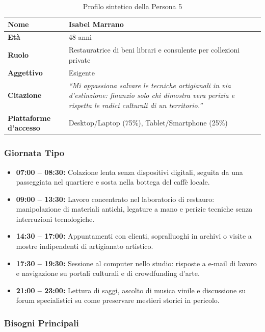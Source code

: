 \documentclass[11pt,a4paper]{article}
\begin{document}
\begin{table}[h!]
\centering
\small
\begin{tabular}{|p{3.5cm}|p{11.5cm}|}
\hline
\textbf{Nome} & Isabel Marrano \\ \hline
\textbf{Età} & 48 anni \\ \hline
\textbf{Ruolo} & Restauratrice di beni librari e consulente per collezioni private \\ \hline
\textbf{Aggettivo} & Esigente \\ \hline
\textbf{Citazione} & \textit{``Mi appassiona salvare le tecniche artigianali in via d'estinzione: finanzio solo chi dimostra vera perizia e rispetta le radici culturali di un territorio.''} \\ \hline
\textbf{Piattaforme d'accesso} & Desktop/Laptop (75\%), Tablet/Smartphone (25\%) \\ \hline
\end{tabular}
\caption{Profilo sintetico della Persona 5}
\label{tab:persona5}
\end{table}

\subsubsection{Giornata Tipo}
\begin{itemize}
    \item \textbf{07:00 -- 08:30:} Colazione lenta senza dispositivi digitali, seguita da una passeggiata nel quartiere e sosta nella bottega del caffè locale.
    \item \textbf{09:00 -- 13:30:} Lavoro concentrato nel laboratorio di restauro: manipolazione di materiali antichi, legature a mano e perizie tecniche senza interruzioni tecnologiche.
    \item \textbf{14:30 -- 17:00:} Appuntamenti con clienti, sopralluoghi in archivi o visite a mostre indipendenti di artigianato artistico.
    \item \textbf{17:30 -- 19:30:} Sessione al computer nello studio: risposte a e-mail di lavoro e navigazione su portali culturali e di crowdfunding d'arte.
    \item \textbf{21:00 -- 23:00:} Lettura di saggi, ascolto di musica vinile e discussione su forum specialistici su come preservare mestieri storici in pericolo.
\end{itemize}

\subsubsection{Bisogni Principali}
\end{document}

